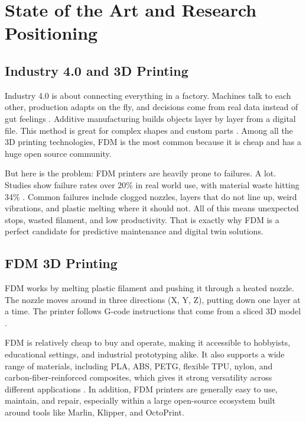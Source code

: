 \chapter{State of the Art and Research Positioning}
\label{chap:stateoftheart}

\section{Industry 4.0 and 3D Printing}

Industry 4.0 is about connecting everything in a factory. Machines talk to each other, production adapts on the fly, and decisions come from real data instead of gut feelings \cite{lasi2014industry,lu2017industry}. Additive manufacturing builds objects layer by layer from a digital file. This method is great for complex shapes and custom parts \cite{gibson2021additive}. Among all the 3D printing technologies, FDM is the most common because it is cheap and has a huge open source community.

But here is the problem: FDM printers are heavily prone to failures. A lot. Studies show failure rates over 20\% in real world use, with material waste hitting 34\% \cite{song2016material}. Common failures include clogged nozzles, layers that do not line up, weird vibrations, and plastic melting where it should not. All of this means unexpected stops, wasted filament, and low productivity. That is exactly why FDM is a perfect candidate for predictive maintenance and digital twin solutions.

\section{FDM 3D Printing}

FDM works by melting plastic filament and pushing it through a heated nozzle. The nozzle moves around in three directions (X, Y, Z), putting down one layer at a time. The printer follows G-code instructions that come from a sliced 3D model \cite{daminabo2020fdm,turner2014review}.

FDM is relatively cheap to buy and operate, making it accessible to hobbyists, educational settings, and industrial prototyping alike. It also supports a wide range of materials, including PLA, ABS, PETG, flexible TPU, nylon, and carbon-fiber-reinforced composites, which gives it strong versatility across different applications \cite{ali2024state}. In addition, FDM printers are generally easy to use, maintain, and repair, especially within a large open-source ecosystem built around tools like Marlin, Klipper, and OctoPrint.

